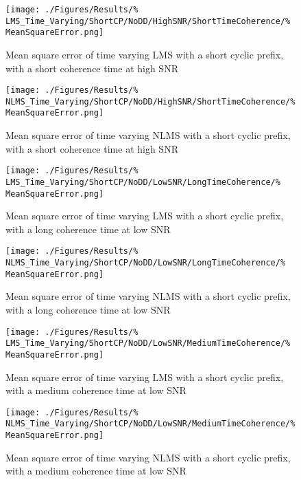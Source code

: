 \begin{figure}[ht]
	\centering
	\begin{minipage}{0.49\textwidth}
		\centering
		\texttt{[image: ./Figures/Results/\%
	LMS\_Time\_Varying/ShortCP/NoDD/HighSNR/ShortTimeCoherence/\%
	MeanSquareError.png]}
		\captionsetup{width=0.75\linewidth}
		\caption{Mean square error of time varying LMS with a 
		short cyclic prefix, with a short coherence time at 
		high SNR}
	\end{minipage}
	\begin{minipage}{0.49\textwidth}
		\centering
		\texttt{[image: ./Figures/Results/\%
	NLMS\_Time\_Varying/ShortCP/NoDD/HighSNR/ShortTimeCoherence/\%
	MeanSquareError.png]}
		\captionsetup{width=0.75\linewidth}
		\caption{Mean square error of time varying NLMS with 
		a short cyclic prefix, with a short coherence time 
		at high SNR}
	\end{minipage}
\end{figure}

\begin{figure}[ht]
	\centering
	\begin{minipage}{0.49\textwidth}
		\centering
		\texttt{[image: ./Figures/Results/\%
	LMS\_Time\_Varying/ShortCP/NoDD/LowSNR/LongTimeCoherence/\%
	MeanSquareError.png]}
		\captionsetup{width=0.75\linewidth}
		\caption{Mean square error of time varying LMS with a 
		short cyclic prefix, with a long coherence time at 
		low SNR}
	\end{minipage}
	\begin{minipage}{0.49\textwidth}
		\centering
		\texttt{[image: ./Figures/Results/\%
	NLMS\_Time\_Varying/ShortCP/NoDD/LowSNR/LongTimeCoherence/\%
	MeanSquareError.png]}
		\captionsetup{width=0.75\linewidth}
		\caption{Mean square error of time varying NLMS with 
		a short cyclic prefix, with a long coherence time 
		at low SNR}
	\end{minipage}
\end{figure}

\begin{figure}[ht]
	\centering
	\begin{minipage}{0.49\textwidth}
		\centering
		\texttt{[image: ./Figures/Results/\%
	LMS\_Time\_Varying/ShortCP/NoDD/LowSNR/MediumTimeCoherence/\%
	MeanSquareError.png]}
		\captionsetup{width=0.75\linewidth}
		\caption{Mean square error of time varying LMS with a 
		short cyclic prefix, with a medium coherence time at 
		low SNR}
	\end{minipage}
	\begin{minipage}{0.49\textwidth}
		\centering
		\texttt{[image: ./Figures/Results/\%
	NLMS\_Time\_Varying/ShortCP/NoDD/LowSNR/MediumTimeCoherence/\%
	MeanSquareError.png]}
		\captionsetup{width=0.75\linewidth}
		\caption{Mean square error of time varying NLMS with 
		a short cyclic prefix, with a medium coherence 
		time at low SNR}
	\end{minipage}
\end{figure}

